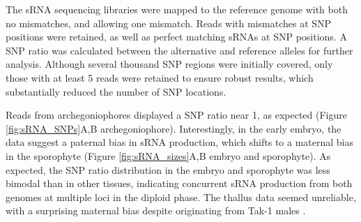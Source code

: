 The sRNA sequencing libraries were mapped to the reference genome with both no mismatches, and allowing one mismatch. Reads with mismatches at SNP positions were retained, as well as perfect matching sRNAs at SNP positions. A SNP ratio was calculated between the alternative and reference alleles for further analysis. Although several thousand SNP regions were initially covered, only those with at least 5 reads were retained to ensure robust results, which substantially reduced the number of SNP locations. 

Reads from archegoniophores displayed a SNP ratio near 1, as expected (Figure \ref{fig:sRNA_SNPs}A,B archegoniophore). Interestingly, in the early embryo, the data suggest a paternal bias in sRNA production, which shifts to a maternal bias in the sporophyte (Figure \ref{fig:sRNA_sizes}A,B embryo and sporophyte). As expected, the SNP ratio distribution in the embryo and sporophyte was less bimodal than in other tissues, indicating concurrent sRNA production from both genomes at multiple loci in the diploid phase. The thallus data seemed unreliable, with a surprising maternal bias despite originating from Tak-1 males \citep{RN265}.

